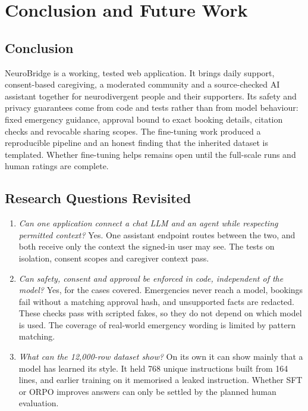 \documentclass[11pt,a4paper]{article}
\begin{document}
\section{Conclusion and Future Work}\label{sec:conclusion}

\subsection{Conclusion}
NeuroBridge is a working, tested web application. It brings daily support, consent-based caregiving,
a moderated community and a source-checked AI assistant together for neurodivergent people and their
supporters. Its safety and privacy guarantees come from code and tests rather than from model
behaviour: fixed emergency guidance, approval bound to exact booking details, citation checks and
revocable sharing scopes. The fine-tuning work produced a reproducible pipeline and an honest finding
that the inherited dataset is templated. Whether fine-tuning helps remains open until the full-scale
runs and human ratings are complete.

\subsection{Research Questions Revisited}
\begin{enumerate}[label=\textbf{RQ\arabic*.}]
  \item \emph{Can one application connect a chat LLM and an agent while respecting permitted context?}
  Yes. One assistant endpoint routes between the two, and both receive only the context the
  signed-in user may see. The tests on isolation, consent scopes and caregiver context pass.
  \item \emph{Can safety, consent and approval be enforced in code, independent of the model?}
  Yes, for the cases covered. Emergencies never reach a model, bookings fail without a matching
  approval hash, and unsupported facts are redacted. These checks pass with scripted fakes, so they
  do not depend on which model is used. The coverage of real-world emergency wording is limited by pattern matching.
  \item \emph{What can the 12,000-row dataset show?}
  On its own it can show mainly that a model has learned its style. It held 768 unique instructions
  built from 164 lines, and earlier training on it memorised a leaked instruction. Whether SFT or ORPO
  improves answers can only be settled by the planned human evaluation.
\end{enumerate}
\end{document}
